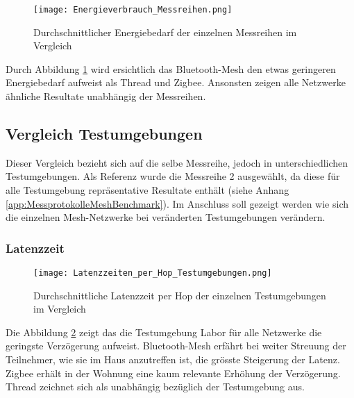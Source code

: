 \begin{figure}[H]
	\centering
	\texttt{[image: Energieverbrauch\_Messreihen.png]}
	\caption{Durchschnittlicher Energiebedarf der einzelnen Messreihen im Vergleich}\label{fig:EnergieverbrauchMessreihen}
\end{figure}

Durch Abbildung \ref{fig:EnergieverbrauchMessreihen} wird ersichtlich das Bluetooth-Mesh den etwas geringeren Energiebedarf aufweist als Thread und Zigbee. Ansonsten zeigen alle Netzwerke ähnliche Resultate unabhängig der Messreihen. 


\subsection{Vergleich Testumgebungen}\label{subsec:VergleichTestumgebungen}

Dieser Vergleich bezieht sich auf die selbe Messreihe, jedoch in unterschiedlichen Testumgebungen. Als Referenz wurde die Messreihe 2 ausgewählt, da diese für alle Testumgebung repräsentative Resultate enthält (siehe Anhang \ref{app:MessprotokolleMeshBenchmark}). Im Anschluss soll gezeigt werden wie sich die einzelnen Mesh-Netzwerke bei veränderten Testumgebungen verändern. \\



\subsubsection{Latenzzeit}\label{subsec:VergleichLatenzzeitTestumgebungen}


\begin{figure}[H]
	\centering
	\texttt{[image: Latenzzeiten\_per\_Hop\_Testumgebungen.png]}
	\caption{Durchschnittliche Latenzzeit per Hop der einzelnen Testumgebungen im Vergleich}\label{fig:Latenzzeiten_per_Hop_Testumgebungen}
\end{figure}

Die Abbildung \ref{fig:Latenzzeiten_per_Hop_Testumgebungen} zeigt das die Testumgebung Labor für alle Netzwerke die geringste Verzögerung aufweist. Bluetooth-Mesh erfährt bei weiter Streuung der Teilnehmer, wie sie im Haus anzutreffen ist, die grösste Steigerung der Latenz. Zigbee erhält in der Wohnung eine kaum relevante Erhöhung der Verzögerung. Thread zeichnet sich als unabhängig bezüglich der Testumgebung aus. 

